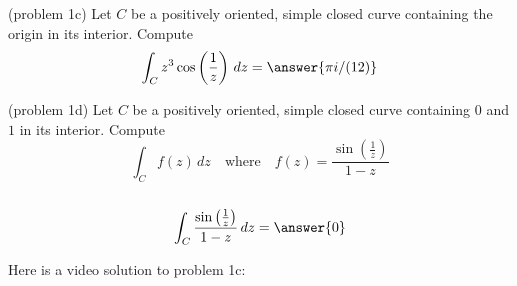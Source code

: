 \documentclass[handout]{ximera}
\begin{document}
\begin{problem}(problem 1c)
Let $C$ be a positively oriented, simple closed curve containing the origin in its interior. Compute
\[
\int_C z^3\cos\left(\frac{1}{z}\right) \, dz = \answer{\pi i/(12)}
\]

\end{problem}

\begin{problem}(problem 1d)
Let $C$ be a positively oriented, simple closed curve containing $0$ and $1$ in its interior. Compute
\[
\int_C f(z) \, dz \quad \text{where} \quad f(z) = \frac{\sin\left(\frac{1}{z}\right)}{1-z}
\]
{}\\
\[
 \int_C \frac{\sin\left(\frac{1}{z}\right)}{1-z} \, dz = \answer{0}
 \]

\end{problem}


Here is a video solution to problem 1c:\\
\begin{foldable}
\end{foldable}
\end{document}

